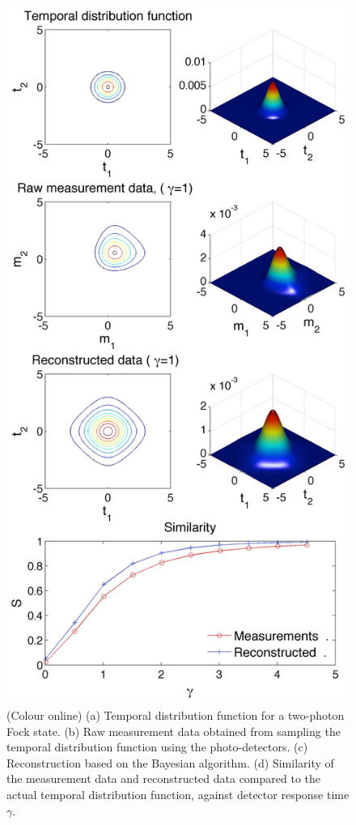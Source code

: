 \documentclass[aps,pra,twocolumn,amsmath,amssymb,color,superscriptaddress]{revtex4}
\begin{document}
\begin{figure}[!htb]
\includegraphics[width=\columnwidth]{figures/composite_fock}
\caption{(Colour online) (a) Temporal distribution function for a two-photon Fock state. (b) Raw measurement data obtained from sampling the temporal distribution function using the photo-detectors. (c) Reconstruction based on the Bayesian algorithm. (d) Similarity of the measurement data and reconstructed data compared to the actual temporal distribution function, against detector response time $\gamma$.} \label{fig:composite_fock}
\end{figure}
\end{document}
